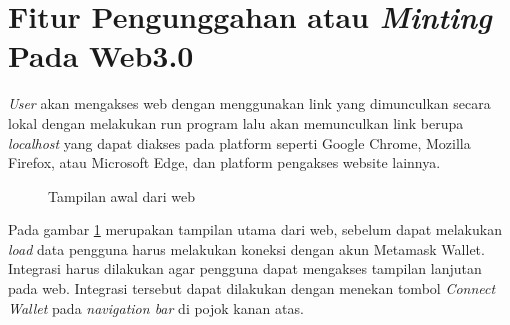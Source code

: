 \section{Fitur Pengunggahan atau \emph{Minting} Pada Web3.0}
\emph{User} akan mengakses web dengan menggunakan link yang dimunculkan secara lokal dengan melakukan run program lalu akan memunculkan link berupa \emph{localhost} yang dapat diakses pada platform seperti Google Chrome, Mozilla Firefox, atau Microsoft Edge, dan platform pengakses website lainnya.

\begin{figure} [H] \centering
  \caption{Tampilan awal dari web}
  \label{fig:web_interface}
  \end{figure}

Pada gambar \ref{fig:web_interface} merupakan tampilan utama dari web, sebelum dapat melakukan \emph{load} data pengguna harus melakukan koneksi dengan akun Metamask Wallet. Integrasi harus dilakukan agar pengguna dapat mengakses tampilan lanjutan pada web. Integrasi tersebut dapat dilakukan dengan menekan tombol \emph{Connect Wallet} pada \emph{navigation bar} di pojok kanan atas.

